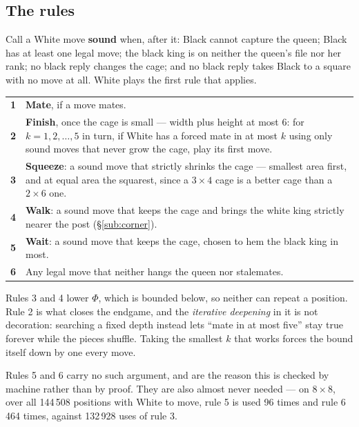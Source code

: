 \documentclass[11pt]{article}
\begin{document}
\subsection{The rules}\label{sub:rules}

Call a White move \textbf{sound} when, after it: Black cannot capture the
queen; Black has at least one legal move; the black king is on neither the
queen's file nor her rank; no black reply changes the cage; and no black reply
takes Black to a square with no move at all. White plays the first rule that
applies.

\begin{center}\small
\begin{tabular}{@{}rp{}@{}}
\toprule
\textbf{1} & \textbf{Mate}, if a move mates. \\[1mm]
\textbf{2} & \textbf{Finish}, once the cage is small --- width plus height at
most 6: for $k=1,2,\dots,5$ in turn, if White has a forced mate in at most $k$
using only sound moves that never grow the cage, play its first move. \\[1mm]
\textbf{3} & \textbf{Squeeze}: a sound move that strictly shrinks the cage ---
smallest area first, and at equal area the squarest, since a $3\times4$ cage is
a better cage than a $2\times6$ one. \\[1mm]
\textbf{4} & \textbf{Walk}: a sound move that keeps the cage and brings the
white king strictly nearer the post (\S\ref{sub:corner}). \\[1mm]
\textbf{5} & \textbf{Wait}: a sound move that keeps the cage, chosen to hem the
black king in most. \\[1mm]
\textbf{6} & Any legal move that neither hangs the queen nor stalemates. \\
\bottomrule
\end{tabular}
\end{center}

\noindent
Rules 3 and 4 lower $\Phi$, which is bounded below, so neither can repeat a
position. Rule 2 is what closes the endgame, and the \emph{iterative
deepening} in it is not decoration: searching a fixed depth instead lets
``mate in at most five'' stay true forever while the pieces shuffle. Taking
the smallest $k$ that works forces the bound itself down by one every move.

\smallskip
Rules 5 and 6 carry no such argument, and are the reason this is checked by
machine rather than by proof. They are also almost never needed --- on
$8\times8$, over all 144\,508 positions with White to move, rule 5 is used 96
times and rule 6 464 times, against 132\,928 uses of rule 3.
\end{document}
